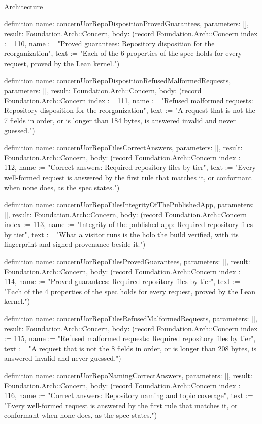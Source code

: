 \begin{lexlean}{Architecture}
\begin{semanticmodule}
definition{
  name: concernUorRepoDispositionProvedGuarantees,
  parameters: [],
  result: Foundation.Arch::Concern,
  body: (record Foundation.Arch::Concern {index := 110, name := "Proved guarantees: Repository disposition for the reorganization", text := "Each of the 6 properties of the spec holds for every request, proved by the Lean kernel."})
}

definition{
  name: concernUorRepoDispositionRefusedMalformedRequests,
  parameters: [],
  result: Foundation.Arch::Concern,
  body: (record Foundation.Arch::Concern {index := 111, name := "Refused malformed requests: Repository disposition for the reorganization", text := "A request that is not the 7 fields in order, or is longer than 184 bytes, is answered invalid and never guessed."})
}

definition{
  name: concernUorRepoFilesCorrectAnswers,
  parameters: [],
  result: Foundation.Arch::Concern,
  body: (record Foundation.Arch::Concern {index := 112, name := "Correct answers: Required repository files by tier", text := "Every well-formed request is answered by the first rule that matches it, or conformant when none does, as the spec states."})
}

definition{
  name: concernUorRepoFilesIntegrityOfThePublishedApp,
  parameters: [],
  result: Foundation.Arch::Concern,
  body: (record Foundation.Arch::Concern {index := 113, name := "Integrity of the published app: Required repository files by tier", text := "What a visitor runs is the holo the build verified, with its fingerprint and signed provenance beside it."})
}

definition{
  name: concernUorRepoFilesProvedGuarantees,
  parameters: [],
  result: Foundation.Arch::Concern,
  body: (record Foundation.Arch::Concern {index := 114, name := "Proved guarantees: Required repository files by tier", text := "Each of the 4 properties of the spec holds for every request, proved by the Lean kernel."})
}

definition{
  name: concernUorRepoFilesRefusedMalformedRequests,
  parameters: [],
  result: Foundation.Arch::Concern,
  body: (record Foundation.Arch::Concern {index := 115, name := "Refused malformed requests: Required repository files by tier", text := "A request that is not the 8 fields in order, or is longer than 208 bytes, is answered invalid and never guessed."})
}

definition{
  name: concernUorRepoNamingCorrectAnswers,
  parameters: [],
  result: Foundation.Arch::Concern,
  body: (record Foundation.Arch::Concern {index := 116, name := "Correct answers: Repository naming and topic coverage", text := "Every well-formed request is answered by the first rule that matches it, or conformant when none does, as the spec states."})
}


\end{semanticmodule}
\end{lexlean}
